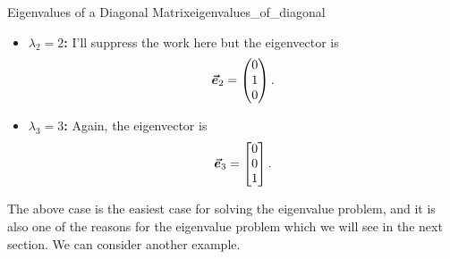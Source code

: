 \begin{ex}{Eigenvalues of a Diagonal Matrix}{eigenvalues_of_diagonal}
\begin{enumerate}
\begin{itemize}
\begin{align*}
                0x+0y+2z&=0 ~\implies~ z=0.
            \end{align*}
            So we have a solution
            \[
            \evec_1 =\begin{bmatrix}
            t\\ 0\\ 0\\
            \end{bmatrix}.
            \]
            We usually prefer our eigenvectors to be normalized, so in this case we take $t=1$ and say that the eigenvector is 
            \[
            \evec_1 =\begin{pmatrix}
            1\\ 0 \\ 0
            \end{pmatrix}.
            \]
            \item \textbf{$\lambda_2=2$:} I'll suppress the work here but the eigenvector is
            \[
            \boldsymbol{\vec{e}}_2 = \begin{pmatrix}
            0 \\ 1 \\ 0
            \end{pmatrix}.
            \]
            \item \textbf{$\lambda_3=3$:} Again, the eigenvector is
            \[
            \boldsymbol{\vec{e}}_3=\begin{bmatrix}
            0 \\ 0 \\ 1
            \end{bmatrix}.
            \]
        \end{itemize}
        \end{enumerate}
        \end{ex}
        
        The above case is the easiest case for solving the eigenvalue problem, and it is also one of the reasons for the eigenvalue problem which we will see in the next section.  We can consider another example.
        
